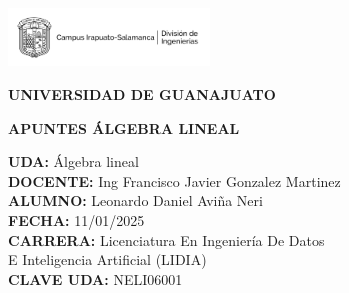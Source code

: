 \documentclass{report} %
\begin{document}

\begin{titlepage} %


    \begin{flushleft}
        \includegraphics[width=0.4\textwidth]{../img/logo_ug.png} %
    \end{flushleft}

    \begin{flushright}
        \vspace{-1.6cm}
        \textbf{UNIVERSIDAD DE GUANAJUATO}
    \end{flushright}

    \vspace{2cm}

    \begin{center}
        \textbf{\Huge APUNTES ÁLGEBRA LINEAL
        } %
    \end{center}

    \vspace{2cm}
    
    \begin{flushleft}
        \hspace*{4cm}
        \textbf{UDA: }Álgebra lineal \\
        \hspace*{4cm}
        \textbf{DOCENTE: }Ing Francisco Javier Gonzalez Martinez \\
        \hspace*{4cm}
        \textbf{ALUMNO: }Leonardo Daniel Aviña Neri \\
        \hspace*{4cm}
        \textbf{FECHA: } 11/01/2025 \\
        \hspace*{4cm}
        \textbf{CARRERA:} Licenciatura En Ingeniería De Datos \\
        \hspace*{4cm}
        E Inteligencia Artificial (LIDIA) \\
        \hspace*{4cm}
        \textbf{CLAVE UDA:} NELI06001
    \end{flushleft}


\end{titlepage}
\end{document}
